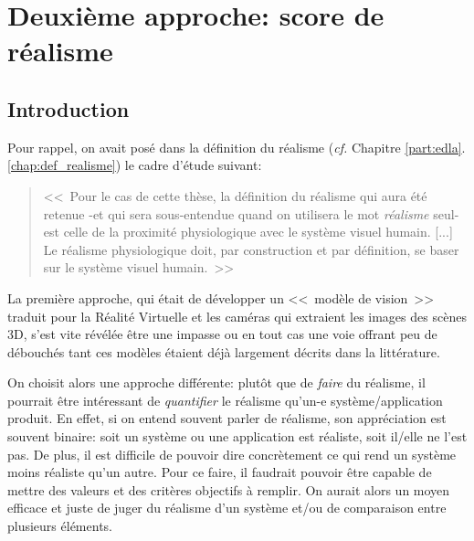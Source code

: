 \part{Deuxième approche: score de réalisme}
	\chapter*{Introduction}
	\par Pour rappel, on avait posé dans la définition du réalisme (\textit{cf.} Chapitre \ref{part:edla}.\ref{chap:def_realisme}) le cadre d'étude suivant:
	\begin{quote}
		<<~Pour le cas de cette thèse, la définition du réalisme qui aura été retenue -et qui sera sous-entendue quand on utilisera le mot \textit{réalisme} seul- est celle de la proximité physiologique avec le système visuel humain. [...] Le réalisme physiologique doit, par construction et par définition, se baser sur le système visuel humain.~>>
	\end{quote}
	La première approche, qui était de développer un <<~modèle de vision~>> traduit pour la Réalité Virtuelle et les caméras qui extraient les images des scènes 3D, s'est vite révélée être une impasse ou en tout cas une voie offrant peu de débouchés tant ces modèles étaient déjà largement décrits dans la littérature.
	
	\par On choisit alors une approche différente: plutôt que de \textit{faire} du réalisme, il pourrait être intéressant de \textit{quantifier} le réalisme qu'un-e système/application produit. En effet, si on entend souvent parler de réalisme, son appréciation est souvent binaire: soit un système ou une application est réaliste, soit il/elle ne l'est pas. De plus, il est difficile de pouvoir dire concrètement ce qui rend un système moins réaliste qu'un autre. Pour ce faire, il faudrait pouvoir être capable de mettre des valeurs et des critères objectifs à remplir. On aurait alors un moyen efficace et juste de juger du réalisme d'un système et/ou de comparaison entre plusieurs éléments.